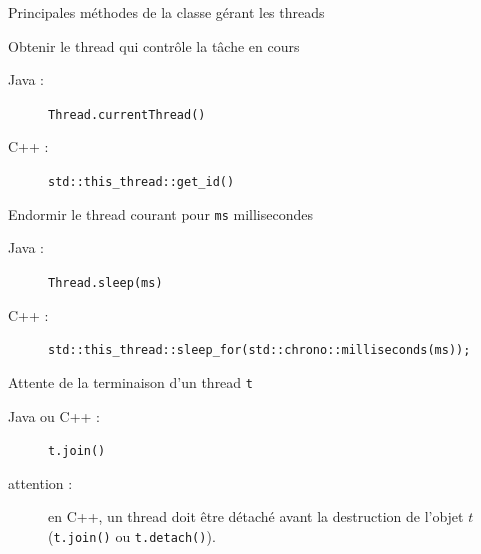 
\begingroup

\begin{frame}[fragile]{Principales méthodes de la classe gérant les threads}

  \begin{block}{Obtenir le thread qui contrôle la tâche en cours}
    \begin{description}
    \item[Java :] \lstinline|Thread.currentThread()| \hspace{\fill}
    \item[C++ :] \lstinline|std::this_thread::get_id()|
    \end{description}
  \end{block}

  \pause
  \vfill

  \begin{block}{Endormir le thread courant pour \lstinline{ms} millisecondes}
    \begin{description}
    \item[Java :] \lstinline|Thread.sleep(ms)| \hspace{\fill}
    \item[C++ :] \lstinline|std::this_thread::sleep_for(std::chrono::milliseconds(ms));|
    \end{description}
  \end{block}

  \pause
  \vfill

  \begin{block}{Attente de la terminaison d'un thread \lstinline{t}}
    \begin{description}
    \item[Java ou C++ :] \lstinline|t.join()|
    \item [\alert{ attention :}] en C++, un thread doit être détaché avant la destruction de l'objet $t$ (\lstinline|t.join()| ou \lstinline|t.detach()|). 
    \end{description}
  \end{block}

\end{frame}

\endgroup
\endinput
